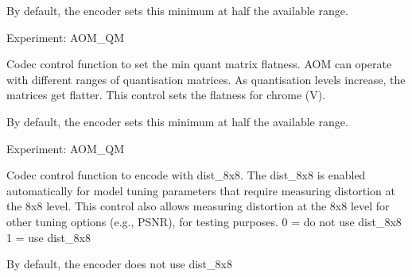 \begin{Desc}
\begin{description}
By default, the encoder sets this minimum at half the available range.

Experiment\+: A\+O\+M\+\_\+\+QM \item[{\em 
A\+V1\+E\+\_\+\+S\+E\+T\+\_\+\+Q\+M\+\_\+V\hypertarget{group__aom__encoder_ggae78dde67a6d78f332e9bdba0dde42db5a458d60628603d6c1c670d7d051634864}{}\label{group__aom__encoder_ggae78dde67a6d78f332e9bdba0dde42db5a458d60628603d6c1c670d7d051634864}
}]Codec control function to set the min quant matrix flatness. A\+OM can operate with different ranges of quantisation matrices. As quantisation levels increase, the matrices get flatter. This control sets the flatness for chrome (V).

By default, the encoder sets this minimum at half the available range.

Experiment\+: A\+O\+M\+\_\+\+QM \item[{\em 
A\+V1\+E\+\_\+\+S\+E\+T\+\_\+\+E\+N\+A\+B\+L\+E\+\_\+\+D\+I\+S\+T\+\_\+8\+X8\hypertarget{group__aom__encoder_ggae78dde67a6d78f332e9bdba0dde42db5a7ef16c780349c5fee8281f1e5b4a6718}{}\label{group__aom__encoder_ggae78dde67a6d78f332e9bdba0dde42db5a7ef16c780349c5fee8281f1e5b4a6718}
}]Codec control function to encode with dist\+\_\+8x8. The dist\+\_\+8x8 is enabled automatically for model tuning parameters that require measuring distortion at the 8x8 level. This control also allows measuring distortion at the 8x8 level for other tuning options (e.\+g., P\+S\+NR), for testing purposes. 0 = do not use dist\+\_\+8x8 1 = use dist\+\_\+8x8

By default, the encoder does not use dist\+\_\+8x8


\end{description}
\end{Desc}
